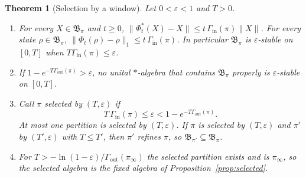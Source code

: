 \documentclass[12pt,a4paper]{article}
\newtheorem{theorem}{Theorem}[section]
\newcommand{\B}{\mathfrak B}
\newcommand{\Gin}{\Gamma_{\mathrm{in}}}
\newcommand{\Gout}{\Gamma_{\mathrm{out}}}
\begin{document}
\begin{theorem}[Selection by a window]
\label{thm:window}
Let $0<\varepsilon<1$ and $T>0$.
\begin{enumerate}
\item For every $X\in\B_\pi$ and $t\ge0$, $\|\Phi_t^*(X)-X\|\le t\,\Gin(\pi)\|X\|$. For every state $\rho\in\B_\pi$, $\|\Phi_t(\rho)-\rho\|_1\le t\,\Gin(\pi)$. In particular $\B_\pi$ is $\varepsilon$-stable on $[0,T]$ when $T\Gin(\pi)\le\varepsilon$.
\item If $1-e^{-T\Gout(\pi)}>\varepsilon$, no unital $*$-algebra that contains $\B_\pi$ properly is $\varepsilon$-stable on $[0,T]$.
\item Call $\pi$ selected by $(T,\varepsilon)$ if
\begin{equation}
T\,\Gin(\pi)\le\varepsilon<1-e^{-T\Gout(\pi)} .
\label{eq:gap}
\end{equation}
At most one partition is selected by $(T,\varepsilon)$. If $\pi$ is selected by $(T,\varepsilon)$ and $\pi'$ by $(T',\varepsilon)$ with $T\le T'$, then $\pi'$ refines $\pi$, so $\B_{\pi'}\subseteq\B_\pi$.
\item For $T>-\ln(1-\varepsilon)/\Gout(\pi_\infty)$ the selected partition exists and is $\pi_\infty$, so the selected algebra is the fixed algebra of Proposition~\ref{prop:selected}.
\end{enumerate}
\end{theorem}
\end{document}
